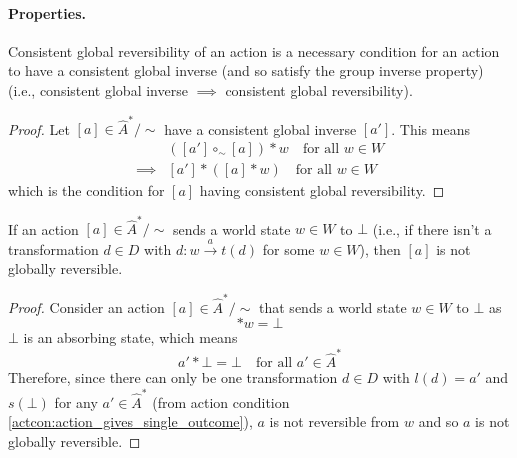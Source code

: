 \paragraph{Properties. }

\begin{proposition}\label{prp:consistent_global_reversibility_necessary_for_consistent_global_inverse}
    Consistent global reversibility of an action is a necessary condition for an action to have a consistent global inverse (and so satisfy the group inverse property)
    (i.e., consistent global inverse $\implies$ consistent global reversibility).
\end{proposition}
\begin{proof}
    Let $[a] \in \hat{A}^{*}/\sim$ have a consistent global inverse $[a']$.
    This means
    \begin{align}
        & ([a'] \circ_{\sim} [a]) \ast w \quad \text{for all $w \in W$} \\
        \implies & [a'] \ast ([a] \ast w) \quad \text{for all $w \in W$}
    \end{align}
    which is the condition for $[a]$ having consistent global reversibility.
\end{proof}

\begin{proposition}\label{prp:undefined_action_not_globally_reversible}
    If an action $[a] \in \hat{A}^{*}/\sim$ sends a world state $w \in W$ to $\bot$ (i.e., if there isn't a transformation $d \in D$ with $d: w \xrightarrow{a} t(d)$ for some $w \in W$), then $[a]$ is not globally reversible.
\end{proposition}
\begin{proof}
    Consider an action $[a] \in \hat{A}^{*}/\sim$ that sends a world state $w \in W$ to $\bot$ as
    \begin{equation}
        [a] * w = \bot
    \end{equation}
    $\bot$ is an absorbing state, which means
    \begin{equation}
        a' * \bot = \bot \quad \text{for all $a' \in \hat{A}^{*}$}
    \end{equation}
    Therefore, since there can only be one transformation $d \in D$ with $l(d) = a'$ and $s(\bot)$ for any $a' \in \hat{A}^{*}$ (from action condition \ref{actcon:action_gives_single_outcome}), $a$ is not reversible from $w$ and so $a$ is not globally reversible.
\end{proof}

